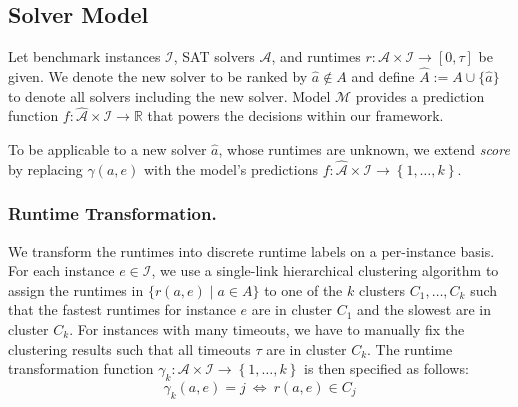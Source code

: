 \documentclass[runningheads]{llncs}
\begin{document}
\subsection{Solver Model}
\label{sec:main-model}


Let benchmark instances $\mathcal{I}$, SAT solvers $\mathcal{A}$, and runtimes $r : \mathcal{A} \times \mathcal{I} \rightarrow \left[0, \tau\right]$ be given. 
We denote the new solver to be ranked by $\hat a \not\in A$ and define $\hat A := A \cup \lbrace \hat a \rbrace$ to denote all solvers including the new solver. 
Model $\mathcal{M}$ provides a prediction function $f : \mathcal{\hat A} \times \mathcal{I} \rightarrow \mathbb{R}$ that powers the decisions within our framework.

To be applicable to a new solver $\hat{a}$, whose runtimes are unknown, we extend \emph{score} by replacing $\gamma(a, e)$ with the model's predictions $f : \mathcal{\hat A} \times \mathcal{I} \rightarrow \left\lbrace 1, \dots, k \right\rbrace$.

\subsubsection{Runtime Transformation.}

We transform the runtimes into discrete runtime labels on a per-instance basis.
For each instance $e \in \mathcal{I}$, we use a single-link hierarchical clustering algorithm to assign the runtimes in $\bigl\{ r(a, e) \mid a \in A \bigr\}$ to one of the $k$ clusters $C_1, \dots, C_k$ such that the fastest runtimes for instance $e$ are in cluster $C_1$ and the slowest are in cluster $C_k$.
For instances with many timeouts, we have to manually fix the clustering results such that all timeouts $\tau$ are in cluster $C_k$.
The runtime transformation function $\gamma_k : {\mathcal{A} \times \mathcal{I}} \rightarrow \left\lbrace 1, \dots, k \right\rbrace$ is then specified as follows:
%
$$\gamma_k(a, e) = j ~\Leftrightarrow~ r(a, e) \in C_j$$
\end{document}

